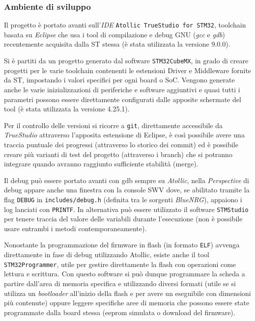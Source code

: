 \subsubsection{Ambiente di sviluppo}


Il progetto \`e portato avanti sull'\textit{IDE} \texttt{Atollic TrueStudio for STM32}, toolchain basata su \textit{Eclipse} che usa i tool di compilazione e debug GNU (\textit{gcc} e \textit{gdb}) recentemente acquisita dalla ST stessa (\`e stata utilizzata la versione 9.0.0).

Si \`e partiti da un progetto generato dal software \texttt{STM32CubeMX}, in grado di creare progetti per le varie toolchain contenenti le estensioni Driver e Middleware fornite da ST, impostando i valori specifici per ogni board o SoC. Vengono generate anche le varie inizializzazioni di periferiche e software aggiuntivi e quasi tutti i parametri possono essere direttamente configurati dalle apposite schermate del tool (\`e stata utilizzata la versione 4.25.1).

Per il controllo delle versioni si ricorre a \texttt{git}, direttamente accessibile da \textit{TrueStudio} attraverso l'apposita estensione di Eclipse, \`e cos\`i possibile avere una traccia puntuale dei progressi (attraverso lo storico dei commit) ed \`e possibile creare pi\`u varianti di test del progetto (attraverso i branch) che si potranno integrare quando avranno raggiunto sufficiente stabilit\`a (merge).

Il debug pu\`o essere portato avanti con gdb sempre su \textit{Atollic}, nella \textit{Perspective} di debug appare anche una finestra con la console SWV dove, se abilitato tramite la flag \texttt{DEBUG} in \texttt{includes/debug.h} (definita tra le sorgenti \textit{BlueNRG}), appaiono i log lanciati con \texttt{PRINTF}. In alternativa pu\`o essere utilizzato il software \texttt{STMStudio} per tenere traccia del valore delle variabili durante l'esecuzione (non \`e possibile usare entrambi i metodi contemporaneamente).

Nonostante la programmazione del firmware in flash (in formato \texttt{ELF}) avvenga direttamente in fase di debug utilizzando Atollic, esiste anche il tool \texttt{STM32Programmer}, utile per gestire direttamente la flash con operazioni come lettura e scrittura. Con questo software si pu\`o dunque programmare la scheda a partire dall'area di memoria specifica e utilizzando diversi formati (utile se si utilizza un \textit{bootloader} all'inizio della flash e per avere un eseguibile con dimensioni pi\`u contenute) oppure leggere specifiche aree di memoria che possono essere state programmate dalla board stessa (eeprom simulata o download del firmware).

